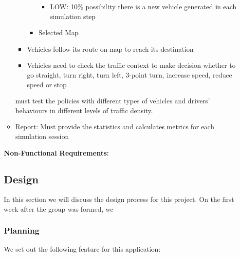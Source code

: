 \documentclass[11pt]{article}
\begin{document}
\begin{itemize}
\begin{itemize}
\begin{itemize}
\begin{itemize}
\begin{itemize}
                \item LOW: 10\% possibility there is a new vehicle generated in each simulation step
                \end{itemize}
            \item Selected Map
            
            
            \end{itemize}
        \item 
        Vehicles follow its route on map to reach its destination
        \item Vehicles need to check the traffic context to make decision whether to go straight, turn right, turn left, 3-point turn, increase speed, reduce speed or stop
        \end{itemize}
        
        
        must test the policies with different types of vehicles and drivers' behaviours in different levels of traffic density.
        \item Report: Must provide the statistics and calculates     metrics  for each simulation session
        
        \end{itemize}


    
    {\bf{Non-Functional Requirements:}} \newline
    
	
\subsection{Design}
In this section we will discuss the design process for this project. On the first week after the group was formed, we 

    \subsubsection{Planning}
    We set out the following feature for this application:
    

\end{itemize}
\end{document}

